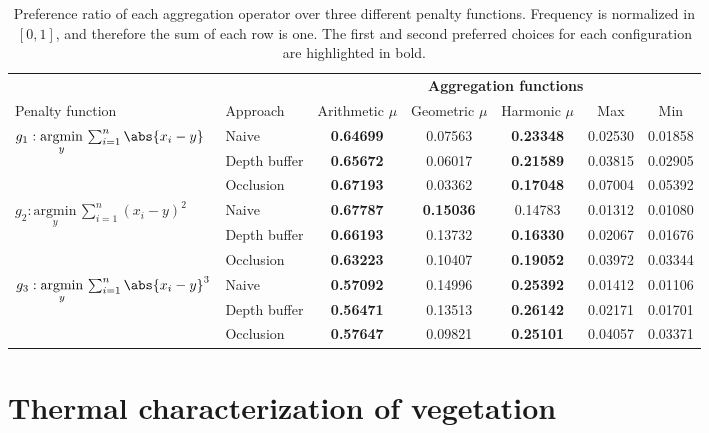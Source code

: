 \renewcommand{\arraystretch}{1.2}
\begin{table}
    \centering
    \caption{Preference ratio of each aggregation operator over three different penalty functions. Frequency is normalized in $[0, 1]$, and therefore the sum of each row is one. The first and second preferred choices for each configuration are highlighted in bold. }
    \label{table:thermal_aggregation_frequency}
    \begin{tabular}{@{}llccccc@{} }
    \toprule
    & & \multicolumn{5}{c}{\textbf{Aggregation functions}} \\
    \cmidrule{3-7}
    Penalty function & Approach & Arithmetic $\mu$ & Geometric $\mu$ & Harmonic $\mu$ & Max & Min\\
    \midrule
    \multirow{2}{*}{$g_1 : \underset{y}{\mathrm{argmin}}\, \sum_{i=1}^{n} \abs{x_i - y}$} & Naive & \textbf{0.64699} & 0.07563 & \textbf{0.23348} & 0.02530 & 0.01858 \\
    & Depth buffer & \textbf{0.65672} & 0.06017 & \textbf{0.21589} & 0.03815 & 0.02905 \\
    & Occlusion & \textbf{0.67193} & 0.03362 & \textbf{0.17048} & 0.07004 & 0.05392 \\
    \multirow{2}{*}{$g_2 : \underset{y}{\mathrm{argmin}}\, \sum_{i=1}^{n} (x_i - y)^2$} & Naive & \textbf{0.67787} & \textbf{0.15036} & 0.14783 & 0.01312 & 0.01080 \\
    & Depth buffer & \textbf{0.66193} & 0.13732 & \textbf{0.16330} & 0.02067 & 0.01676 \\
    & Occlusion & \textbf{0.63223} & 0.10407 & \textbf{0.19052} & 0.03972 & 0.03344 \\
    \multirow{2}{*}{$g_3 : \underset{y}{\mathrm{argmin}}\, \sum_{i=1}^{n} \abs{x_i - y}^3$} & Naive & \textbf{0.57092} & 0.14996 & \textbf{0.25392} & 0.01412 & 0.01106 \\
    & Depth buffer & \textbf{0.56471} & 0.13513 & \textbf{0.26142} & 0.02171 & 0.01701 \\
    & Occlusion & \textbf{0.57647} & 0.09821 & \textbf{0.25101} & 0.04057 & 0.03371 \\
    \bottomrule
    \end{tabular}
\end{table}
\renewcommand{\arraystretch}{1}

\section{Thermal characterization of vegetation}

